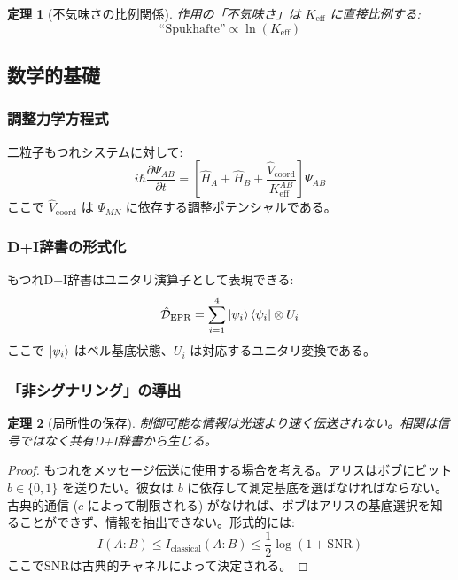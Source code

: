 \documentclass[11pt,a4paper]{article}
\newtheorem{theorem}{定理}
\begin{document}
	\begin{theorem}[不気味さの比例関係]
		作用の「不気味さ」は $K_{\mathrm{eff}}$ に直接比例する:
		\begin{equation}
			\text{``Spukhafte''} \propto \ln(K_{\mathrm{eff}})
		\end{equation}
	\end{theorem}
	
	\subsection{数学的基礎}
	\label{subsec:math-foundation}
	
	\subsubsection{調整力学方程式}
	二粒子もつれシステムに対して:
	\begin{equation}
		i\hbar \frac{\partial \Psi_{AB}}{\partial t} = \left[ \hat{H}_A + \hat{H}_B + \frac{\hat{V}_{\text{coord}}}{K_{\mathrm{eff}}^{AB}} \right] \Psi_{AB}
	\end{equation}
	ここで $\hat{V}_{\text{coord}}$ は $\Psi_{MN}$ に依存する調整ポテンシャルである。
	
	\subsubsection{D+I辞書の形式化}
	もつれD+I辞書はユニタリ演算子として表現できる:
	\begin{equation}
		\hat{\mathcal{D}}_{\text{EPR}} = \sum_{i=1}^{4} \ket{\psi_i}\bra{\psi_i} \otimes U_i
	\end{equation}
	ここで $\ket{\psi_i}$ はベル基底状態、$U_i$ は対応するユニタリ変換である。
	
	\subsubsection{「非シグナリング」の導出}
	\begin{theorem}[局所性の保存]
		制御可能な情報は光速より速く伝送されない。相関は信号ではなく共有D+I辞書から生じる。
	\end{theorem}
	
	\begin{proof}
		もつれをメッセージ伝送に使用する場合を考える。アリスはボブにビット $b \in \{0,1\}$ を送りたい。彼女は $b$ に依存して測定基底を選ばなければならない。古典的通信 ($c$ によって制限される) がなければ、ボブはアリスの基底選択を知ることができず、情報を抽出できない。形式的には:
		\begin{equation}
			I(A:B) \leq I_{\text{classical}}(A:B) \leq \frac{1}{2} \log(1 + \text{SNR})
		\end{equation}
		ここでSNRは古典的チャネルによって決定される。
	\end{proof}
	
\end{document}
